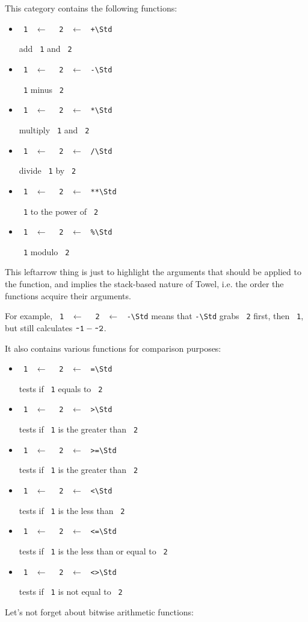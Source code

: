 \documentclass{report}
\newcommand{\mstd}[1]{\texttt{#1\textbackslash Std}}
\newcommand{\mtilde}[1]{\textasciitilde}
\newcommand{\marg}[1]{\texttt{\mtilde ~#1}}
\newcommand{\mla}[0]{~$\leftarrow$ ~}
\newcommand{\arithstd}[1]{\marg{1} \mla \marg{2} \mla \mstd{#1}}
\begin{document}
This category contains the following functions:
\begin{itemize}
\item \arithstd{+}

add \marg1 and \marg2
\item \arithstd{-}

\marg1 minus \marg2
\item \arithstd{*}

multiply \marg1 and \marg2
\item \arithstd{/}

divide \marg1 by \marg2
\item \arithstd{**}

\marg1 to the power of \marg2
\item \arithstd{\%}

\marg1 modulo \marg2
\end{itemize}

\begin{mdframed}[style=hint]
  This leftarrow thing is just to highlight the arguments that should be applied to the function, and implies the stack-based nature of Towel, i.e. the order the functions acquire their arguments.

  For example, \arithstd{-} means that \mstd{-} grabs \marg2 first, then \marg1, but still calculates $\marg1 - \marg2$.
\end{mdframed}

It also contains various functions for comparison purposes:

\begin{itemize}
\item \arithstd{=}

tests if \marg1 equals to \marg2
\item \arithstd{>}

tests if \marg1 is the greater than \marg2
\item \arithstd{>=}

tests if \marg1 is the greater than \marg2
\item \arithstd{<}

tests if \marg1 is the less than \marg2
\item \arithstd{<=}

tests if \marg1 is the less than or equal to \marg2
\item \arithstd{<>}

tests if \marg1 is not equal to \marg2
\end{itemize}

Let's not forget about bitwise arithmetic functions:
\end{document}
